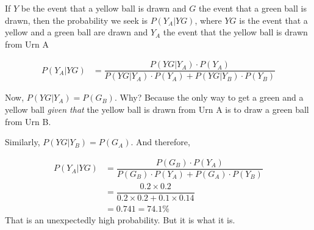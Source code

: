\begin{solution}
   If $Y$ be the event that a yellow ball is drawn and $G$ the event that a green ball is 
   drawn, then the probability we seek is $P(Y_A \vert YG)$, where $YG$ is the event
   that a yellow and a green ball are drawn and $Y_A$ the event that the yellow ball is 
   drawn from Urn A
   
   \begin{align}
      P(Y_A \vert YG) &= \dfrac{P(YG \vert Y_A)\cdot P(Y_A)}{P(YG \vert Y_A)\cdot P(Y_A) + P(YG \vert Y_B)\cdot P(Y_B)}
   \end{align}
   
   Now, $P(YG \vert Y_A) = P(G_B)$. Why? Because the only way to get a green and a yellow ball 
   \textit{given that} the yellow ball is drawn from Urn A is to draw a green ball from Urn B.
   
   Similarly, $P(YG \vert Y_B) = P(G_A)$. And therefore, 
   
   \begin{align}
       P(Y_A \vert YG) &= \dfrac{P(G_B)\cdot P(Y_A)}{P(G_B)\cdot P(Y_A) + P(G_A)\cdot P(Y_B)} \\
                       &= \dfrac{0.2 \times 0.2}{0.2\times 0.2 + 0.1\times 0.14} \\
                       &= 0.741 = 74.1\%
   \end{align}
   That is an unexpectedly high probability. But it is what it is.
\end{solution}

